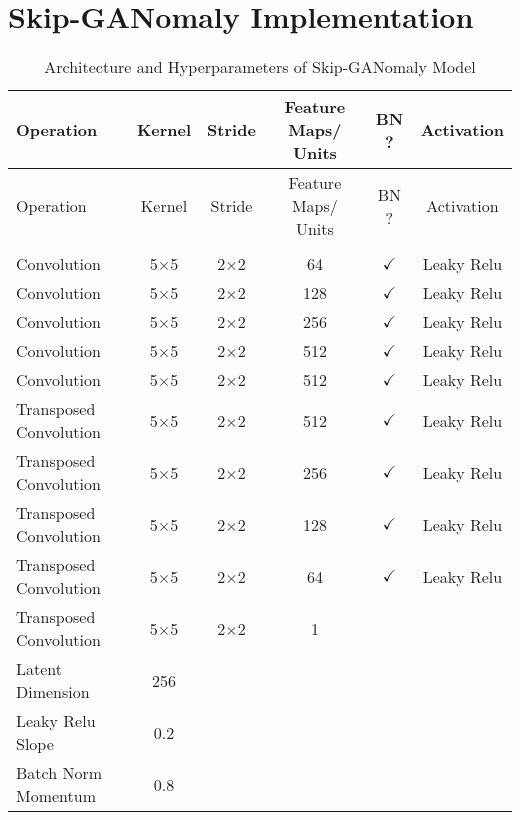 \section{Skip-GANomaly Implementation}
\label{app:sganomaly}
\footnotesize
\begin{longtable}[c]{@{}lccccc@{}}
	\caption{Architecture and Hyperparameters of Skip-GANomaly Model}
	\label{tab:sganomaly_imp}\\
	\toprule
	Operation & Kernel & Stride & Feature Maps/ Units & BN ? & Activation \\* \midrule
	\endfirsthead
	\toprule
	Operation & Kernel & Stride & Feature Maps/ Units & BN ? & Activation \\* \midrule
	\endhead
	\bottomrule
	\endfoot
	\endlastfoot
	\multicolumn{6}{l}{\textbf{Generator}} \\
	Convolution & \multicolumn{1}{c}{5$\times$5} & 2$\times$2 & 64 & $\checkmark$ & Leaky Relu \\
	Convolution & \multicolumn{1}{c}{5$\times$5} & 2$\times$2 & 128 & $\checkmark$ & Leaky Relu \\
	Convolution & \multicolumn{1}{c}{5$\times$5} & 2$\times$2 & 256 & $\checkmark$ & Leaky Relu \\
	Convolution & \multicolumn{1}{c}{5$\times$5} & 2$\times$2 & 512 & $\checkmark$ & Leaky Relu \\
	Convolution & \multicolumn{1}{c}{5$\times$5} & 2$\times$2 & 512 & $\checkmark$ & Leaky Relu \\
	Transposed Convolution & \multicolumn{1}{c}{5$\times$5} & 2$\times$2 & 512 & $\checkmark$ & Leaky Relu \\
	Transposed Convolution & \multicolumn{1}{c}{5$\times$5} & 2$\times$2 & 256 & $\checkmark$ & Leaky Relu \\
	Transposed Convolution & \multicolumn{1}{c}{5$\times$5} & 2$\times$2 & 128 & $\checkmark$ & Leaky Relu \\
	Transposed Convolution & \multicolumn{1}{c}{5$\times$5} & 2$\times$2 & 64 & $\checkmark$ & Leaky Relu \\
	Transposed Convolution & \multicolumn{1}{c}{5$\times$5} & 2$\times$2 & 1 &  &  \\ \hline
	Latent Dimension & 256 & \multicolumn{1}{l}{} & \multicolumn{1}{l}{} & \multicolumn{1}{l}{} & \multicolumn{1}{l}{} \\
	Leaky Relu Slope & 0.2 & \multicolumn{1}{l}{} & \multicolumn{1}{l}{} & \multicolumn{1}{l}{} & \multicolumn{1}{l}{} \\
	Batch Norm Momentum & 0.8 & \multicolumn{1}{l}{} & \multicolumn{1}{l}{} & \multicolumn{1}{l}{} & \multicolumn{1}{l}{} \\

\end{longtable}
